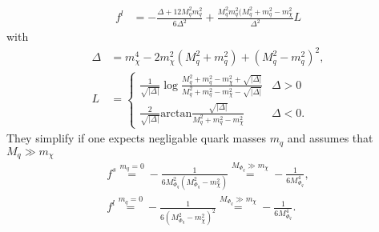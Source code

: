 \begin{appendix}
\begin{align}
 f^l &=-\frac{\Delta+12M_q^2m_q^2}{6\Delta^2} + \frac{M_q^2m_q^2(M_q^2+m_q^2-m_\chi^2}{\Delta^2}L
\end{align}
with
\begin{align}
 \Delta &= m_\chi^4-2m_\chi^2(M_q^2+m_q^2) + (M_q^2-m_q^2)^2,\\
 L&= \begin{cases} \frac{1}{\sqrt{|\Delta|}}\log\frac{M_q^2+m_q^2-m_\chi^2+\sqrt{|\Delta|}}{M_q^2+m_q^2-m_\chi^2-\sqrt{|\Delta|}} & \Delta>0\\ 
		  \frac{2}{\sqrt{|\Delta|}}\text{arctan}\frac{\sqrt{|\Delta|}}{M_q^2+m_q^2-m_\chi^2} &\Delta<0.   
     \end{cases}
\end{align}
They simplify if one expects negligable quark masses $m_q$ and assumes that $M_q \gg m_\chi$
\begin{align}
 f^s \stackrel{m_q=0}{=} - \frac{1}{6M_{\Phi_q}^2\left(M_{\Phi_q}^2-m_\chi^2\right)} \stackrel{M_{\Phi_q}\gg m_\chi}{=} -\frac{1}{6M_{\Phi_q}^4},\\
 f^l \stackrel{m_q=0}{=} - \frac{1}{6\left(M_{\Phi_q}^2-m_\chi^2\right)^2}  \stackrel{M_{\Phi_q}\gg m_\chi}{=} -\frac{1}{6M_{\Phi_q}^4}.
\end{align}


\end{appendix}
